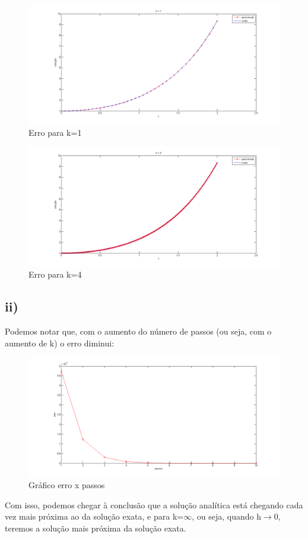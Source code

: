 \documentclass[10pt,a4paper]{article}
\begin{document}
\begin{minipage}[b]{0.48\textwidth}
\centering
\begin{figure}[H]
\centering
\includegraphics[scale=0.25]{k_1.png}
\caption{Erro para k=1}
\end{figure}
\end{minipage}
\begin{minipage}[b]{0.5\textwidth}
\centering
\begin{figure}[H]
\centering
\includegraphics[scale=0.25]{k_4.png}
\caption{Erro para k=4}
\end{figure}
\end{minipage}
\subsection*{ii)}
Podemos notar que, com o aumento do número de passos (ou seja, com o aumento de k) o erro diminui:
\begin{figure}[H]
\centering
\includegraphics[scale=0.5]{err_plot.png}
\caption{Gráfico erro x passos}
\end{figure}
Com isso, podemos chegar à conclusão que a solução analítica está chegando cada vez mais próxima ao da solução exata, e para k=$\infty$, ou seja, quando h$\rightarrow$0, teremos a solução mais próxima da solução exata.
\end{document}
